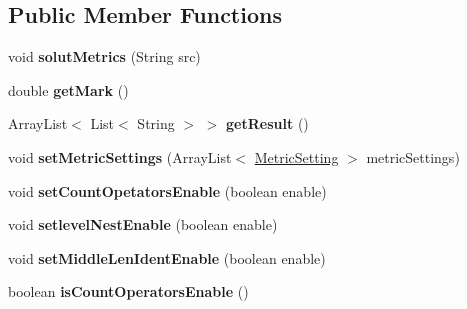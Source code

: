 \subsection*{Public Member Functions}
\begin{DoxyCompactItemize}
\item 
\mbox{\label{classanalyzer_1_1code_1_1AnalyzerC_a8740c2023bd7760c83abc8c630b5e121}} 
void {\bfseries solut\+Metrics} (String src)
\item 
\mbox{\label{classanalyzer_1_1code_1_1AnalyzerC_a30bd977b7051d259f050445884486a31}} 
double {\bfseries get\+Mark} ()
\item 
\mbox{\label{classanalyzer_1_1code_1_1AnalyzerC_ac96e4a7523afbcc244510bcfa8b39592}} 
Array\+List$<$ List$<$ String $>$ $>$ {\bfseries get\+Result} ()
\item 
\mbox{\label{classanalyzer_1_1code_1_1AnalyzerC_ada6b4b8177faa6d037226bdae4f827ce}} 
void {\bfseries set\+Metric\+Settings} (Array\+List$<$ \hyperlink{classanalyzer_1_1code_1_1MetricSetting}{Metric\+Setting} $>$ metric\+Settings)
\item 
\mbox{\label{classanalyzer_1_1code_1_1AnalyzerC_ae1858bb7eb088cd1bf0178e39af8f959}} 
void {\bfseries set\+Count\+Opetators\+Enable} (boolean enable)
\item 
\mbox{\label{classanalyzer_1_1code_1_1AnalyzerC_a8d52368cccc22a8dff3f28d17afd1d5c}} 
void {\bfseries setlevel\+Nest\+Enable} (boolean enable)
\item 
\mbox{\label{classanalyzer_1_1code_1_1AnalyzerC_a466520117ab0a64f30798f0724c22dc2}} 
void {\bfseries set\+Middle\+Len\+Ident\+Enable} (boolean enable)
\item 
\mbox{\label{classanalyzer_1_1code_1_1AnalyzerC_a4cd5fd657befcff0c43b851ec503382c}} 
boolean {\bfseries is\+Count\+Operators\+Enable} ()
\item 
\mbox{\label{classanalyzer_1_1code_1_1AnalyzerC_a69050bcc817ff2f824f69a5fd769f5b4}} 

\end{DoxyCompactItemize}
